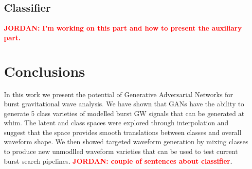 \documentclass[12pt]{iopart}
\newcommand{\jordan}[1]{\textbf{\textcolor{red}{JORDAN: #1}}}
\begin{document}

\subsection{Classifier}
\jordan{I'm working on this part and how to present the auxiliary part.}


\section{Conclusions}
In this work we present the potential of Generative Adversarial Networks for burst gravitational wave analysis. We have shown that GANs have the ability to generate 5 class varieties of modelled burst GW signals that can be generated at whim. The latent and class spaces were explored through interpolation and suggest that the space provides smooth translations between classes and overall waveform shape. We then showed targeted waveform generation by mixing classes to produce new unmodlled waveform varieties that can be used to test current burst search pipelines. \jordan{couple of sentences about classifier}. 
\end{document}
